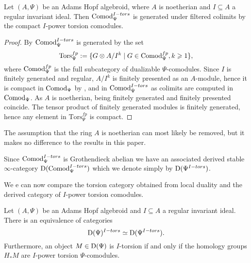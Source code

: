 \begin{lemma}
    \label{ch2:lm:torsion-comodules-generated-by-compacts}
    Let $(A,\Psi)$ be an Adams Hopf algebroid, where $A$ is noetherian and $I\subseteq A$ a regular invariant ideal. Then $\mathrm{Comod}_\Psi^{I-tors}$ is generated under filtered colimits by the compact $I$-power torsion comodules. 
\end{lemma}
\begin{proof}
    By \cite[3.4]{barthel-heard-valenzuela_2020} $\mathrm{Comod}_\Psi^{I-tors}$ is generated by the set 
    $$\mathrm{Tors}_\Psi^{fp}:=\{G\otimes A/I^k \mid G \in \mathrm{Comod}_\Psi^{fp}, k\geqslant 1\},$$
    where $\mathrm{Comod}_\Psi^{fp}$ is the full subcategory of dualizable $\Psi$-comodules. Since $I$ is finitely generated and regular, $A/I^k$ is finitely presented as an $A$-module, hence it is compact in $\mathrm{Comod}_\Psi$ by \cite[1.4.2]{hovey_04}, and in $\mathrm{Comod}_\Psi^{I-tors}$ as colimits are computed in $\mathrm{Comod}_\Psi$. As $A$ is noetherian, being finitely generated and finitely presented coincide. The tensor product of finitely generated modules is finitely generated, hence any element in $\mathrm{Tors}_\Psi^{fp}$ is compact. 
\end{proof}

\begin{remark}
    The assumption that the ring $A$ is noetherian can most likely be removed, but it makes no difference to the results in this paper.  
\end{remark}

\begin{notation}
    Since $\mathrm{Comod}_\Psi^{I-tors}$ is Grothendieck abelian we have an associated derived stable $\infty$-category $\mathrm{D}(\mathrm{Comod}_\Psi^{I-tors})$ which we denote simply by $\mathrm{D}(\Psi^{I-tors})$.
\end{notation}

We e can now compare the torsion category obtained from local duality and the derived category of $I$-power torsion comodules. 

\begin{lemma}
    \label{ch2:lm:derived-torsion-if-homology-torsion}
    Let $(A,\Psi)$ be an Adams Hopf algebroid and $I\subseteq A$ a regular invariant ideal. There is an equivalence of categories 
    $$\mathrm{D}(\Psi)^{I-tors}\simeq \mathrm{D}(\Psi^{I-tors}).$$ 
    Furthermore, an object $M\in \mathrm{D}(\Psi)$ is $I$-torsion if and only if the homology groups $H_* M$ are $I$-power torsion $\Psi$-comodules.
\end{lemma}

